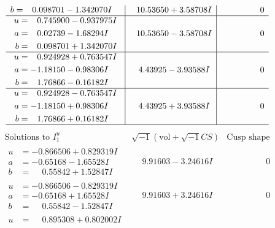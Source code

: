 \documentclass[1p]{elsarticle_modified}
\theoremstyle{definition}
\newcommand{\I}{\sqrt{-1}}
\begin{document}
$$\begin{array}{c|c|c}
\begin{aligned}
b &= \phantom{-}0.098701 - 1.342070 I\end{aligned}
 & \phantom{-}10.53650 + 3.58708 I & \phantom{-0.000000 } 0 \\ \hline\begin{aligned}
u &= \phantom{-}0.745900 - 0.937975 I \\
a &= \phantom{-}0.02739 - 1.68294 I \\
b &= \phantom{-}0.098701 + 1.342070 I\end{aligned}
 & \phantom{-}10.53650 - 3.58708 I & \phantom{-0.000000 } 0 \\ \hline\begin{aligned}
u &= \phantom{-}0.924928 + 0.763547 I \\
a &= -1.18150 - 0.98306 I \\
b &= \phantom{-}1.76866 - 0.16182 I\end{aligned}
 & \phantom{-}4.43925 - 3.93588 I & \phantom{-0.000000 } 0 \\ \hline\begin{aligned}
u &= \phantom{-}0.924928 - 0.763547 I \\
a &= -1.18150 + 0.98306 I \\
b &= \phantom{-}1.76866 + 0.16182 I\end{aligned}
 & \phantom{-}4.43925 + 3.93588 I & \phantom{-0.000000 } 0\\
 \hline 
 \end{array}$$\newpage$$\begin{array}{c|c|c}  
\text{Solutions to }I^u_{1}& \I (\text{vol} + \sqrt{-1}CS) & \text{Cusp shape}\\
 \hline 
\begin{aligned}
u &= -0.866506 + 0.829319 I \\
a &= -0.65168 - 1.65528 I \\
b &= \phantom{-}0.55842 + 1.52847 I\end{aligned}
 & \phantom{-}9.91603 - 3.24616 I & \phantom{-0.000000 } 0 \\ \hline\begin{aligned}
u &= -0.866506 - 0.829319 I \\
a &= -0.65168 + 1.65528 I \\
b &= \phantom{-}0.55842 - 1.52847 I\end{aligned}
 & \phantom{-}9.91603 + 3.24616 I & \phantom{-0.000000 } 0 \\ \hline\begin{aligned}
u &= \phantom{-}0.895308 + 0.802002 I \\

\end{aligned}
\end{array}$$
\end{document}

